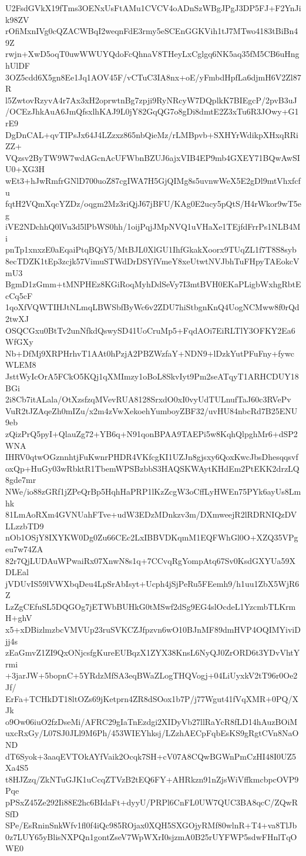 U2FsdGVkX19fTms3OENxUsFtAMu1CVCV4oADnSzWBgJPgJ3DP5FJ+F2YnJik98ZV
rOfiMxnIVg0cQZACWBqI2weqnFdE3rmy5eSCEnGGKVih1tJ7MTwo4183tBiBn49Z
rwjn+XwD5oqT0uwWWUYQdoFcQhnaV8THeyLxCglgq6NK5aq35fM5CB6uHnghUlDF
3OZ5cdd6X5gn8Ee1Jq1AOV45F/vCTuC3IA8nx+oE/yFmbdHpfLa6djmH6V2Zl87R
l5ZwtovRzyvA4r7Ax3xH2oprwtnBg7zpji9RyNRcyW7DQplkK7BIEgcP/2pvB3uJ
/OCEzJhkAuA6JmQfsxlhKAJ9L0jY82GqQG7o8gDi8dmtE2Z3xTu6R3JOwy+G1rE9
DgDnCAL+qvTIPsJx64J4LZzxz865nbQieMz/rLMBpvb+SXHYrWdikpXHxqRRiZZ+
VQzsv2ByTW9W7wdAGcnAcUFWbnBZUJ6ajxVIB4EP9mb4GXEY71BQwAwSIU0+XG3H
wEt3+hJwRmfrGNlD700uoZ87cgIWA7H5GjQIMg8s5uvnwWeX5E2gDl9mtVhxfcfu
fqtH2VQmXqcYZDz/oqgm2Mz3riQjJ67jBFU/KAg0E2ucy5pQtS/H4rWkor9wT5eg
iVE2NDchhQ0lVu3d5lPbWS0hh/1oijPqjJMpNVQ1uVHaXe1TEjfdFrrPs1NLB4Mi
pnTp1xnxzE0aEqaiPtqBQiY5/MtBJL0XlGU1IhfGkakXoorx9TUqZL1f7T8S8syb
8ecTDZK1tEp3zcjk57VimuSTWdDrDSYfVmeY8xeUtwtNVJbhTuFHpyTAEokcVmU3
BgmD1zGmm+tMNPHEz8KGiRoqMyhDdSeVy7I3mtBVH0EKaPLigbWxhgRbtEcCq5cF
1qoXfVQWTIHJtNLmqLBWSbfByWc6v2ZDU7hiStbgnKnQ4UogNCMww8f0rQd2twXJ
OSQCGxu0BtTv2unNfkdQswySD41UoCruMp5+FqdAOi7EiRLTlY3OFKY2Ea6WfGXy
Nb+DfMj9XRPHrhvT1AAt0hPzjA2PBZWzfaY+NDN9+lDzkYutPFuFny+fywcWLEM8
JsttWyIcOrA5FCkO5KQj1qXMImzy1oBoL8SkvIyt9Pm2seATqyT1ARHCDUY18BGi
2i8Cb7itALala/OtXzsfzqMVevRUA8128SrxdO0xI0vyUdTULnufTaJ60c3RVePv
VuR2tJZAqeZh0mIZu/x2m4zVwXekoehYumboyZBF32/uvHU84nbcRd7B25ENU9eb
zQizPrQ5pyI+QlauZg72+YB6q+N91qonBPAA9TAEPi5w8KqhQlpghMr6+dSP2WNA
IHRV0qtwOGznnhtjFuKwnrPHDR4VKfcgKI1UZJn8gjsxy6QoxKwcJbsDhesqqsvf
oxQp+HuGy03wRbktR1TbemWPSBzbbS3HAQSKWAytKHdEm2PtEKK2drzLQ8gde7mr
NWe/io88zGRf1jZPeQrBp5HqhHaPRP1lKzZcgW3oCffLyHWEn75PYk6ayUs8Lmhk
81LmAoRXm4GVNUahFTve+udW3EDzMDnkzv3m/DXmweejR2lRDRNIQzDVLLzzbTD9
nOb1OSjY8IXYKW0Dg0Zu66CEc2LxIBBVDKqmM1EQFWhGl0O+XZQ35VPgeu7w74ZA
82r7QjLUDAuWPwaiRx07XnwN8s1q+7CCvqRgYompAtq67Sv0KsdGXYUa59XDLEal
jVDUvIS59lVWXbqDeu4LpSrAbIsyt+Ucph4jSjPeRu5FEemh9/h1uu1ZbX5WjR6Z
LzZgCEfuSL5DQGOg7jETWbBUHkG0tMSwf2dSg9EG4slOcdeL1YzcmbTLKrmH+ghV
x5+xDBizlmzbcVMVUp23ruSVKCZJfpzvn6wO10BJnMF89dmHVP4OQIMYiviDjj4s
zEaGmvZ1ZI9QxONjcsfgKureEUBqzX1ZYX38KnsL6NyQJ0ZrORD6t3YDvVhtYrmi
+3jarJW+5bopnC+5YRdzMfSA3eqBWaZLogTHQVogj+04LiUyxkV2tT96r0Oe2Jf/
ErFa+TCHkDT18ltOZs69jKetprn4ZR8dSOox1b7P/j77Wgut41fVqXMR+0PQ/XJk
o9Ow06iuO2fzDseMi/AFRC29gIaTnEzdgi2XIDyVb27llRaYcR8fLD14hAuzBOiM
uxcRxGy/L07SJ0JLl9M6Ph/453WIEYhksj/LZzhAECpFqbEsKS9gRgtCVn8NaOND
dT6Syok+3aaqEVTOkAYfVaik2Ocqk7SH+cV07A8CQwBGWnPmCzHI48I0UZ5Xa4S5
t8HJZzq/ZkNTuGJK1uCcqZTVzB2tEQ6FY+AHRkzn91nZjsWiVffkmcbpcOVP9Pqe
pPSxZ45Ze292Ii88E2hc6BIdaFt+dyyU/PRPl6CnFL0UW7QUC3BA8qcC/ZQwRSfD
SPe/EsRninSnkWfv1fl0f4iQc985ROjax0XQH5SXGOjyRMf80wlnR+T4+va8TlJb
0z7LUY65yBlisNXPQn1gontZseV7WpWXrI0sjzmA0B25rUYFWP5sdwFHnlTqOWE0

